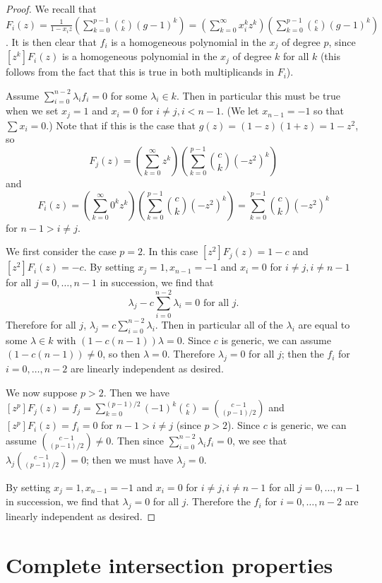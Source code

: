 \documentclass{amsart}
\numberwithin{equation}{section}
\theoremstyle{definition}
\begin{document}
\begin{proof} 
We recall that $F_i(z)=\frac{1}{1-x_iz}\left(\sum_{k=0}^{p-1} \binom{c}{k} (g-1)^k\right)=\left(\sum_{k=0}^\infty x_i^kz^k\right)\left(\sum_{k=0}^{p-1} \binom{c}{k} (g-1)^k\right)$. It is then clear that $f_i$ is a homogeneous polynomial in the $x_j$ of degree $p$, since $[z^k]F_i(z)$ is a homogeneous polynomial in the $x_j$ of degree $k$ for all $k$ (this follows from the fact that this is true in both multiplicands in $F_i$). 

Assume $\sum_{i=0}^{n-2} \lambda_if_i=0$ for some $\lambda_i \in k$. Then in particular this must be true when we set $x_j=1$ and $x_i=0$ for $i \ne j,i < n-1$. (We let $x_{n-1}=-1$ so that $\sum x_i=0$.) Note that if this is the case that $g(z)=(1-z)(1+z)=1-z^2$, so 
\[
F_j(z)=\left(\sum_{k=0}^\infty z^k\right)\left(\sum_{k=0}^{p-1} \binom{c}{k} (-z^2)^k\right)
\]
and 
\[
F_i(z)=\left(\sum_{k=0}^\infty 0^kz^k\right)\left(\sum_{k=0}^{p-1} \binom{c}{k} (-z^2)^k\right)=\sum_{k=0}^{p-1} \binom{c}{k} (-z^2)^k
\]
for $n-1>i \ne j$.

We first consider the case $p=2$. In this case $[z^2]F_j(z)=1-c$ and $[z^2]F_i(z)=-c$. By setting $x_j=1,x_{n-1}=-1$ and $x_i=0$ for $i \ne j, i \ne n-1$ for all $j=0,\dots,n-1$ in succession, we find that 
\[
\lambda_j-c\sum_{i=0}^{n-2} \lambda_i = 0 \text{ for all }j.
\]
Therefore for all $j$, $\lambda_j=c\sum_{i=0}^{n-2} \lambda_i$. Then in particular all of the $\lambda_i$ are equal to some $\lambda \in k$ with $(1-c(n-1))\lambda = 0$. Since $c$ is generic, we can assume $(1-c(n-1)) \ne 0$, so then $\lambda=0$. Therefore $\lambda_j=0$ for all $j$; then the $f_i$ for $i=0,\dots,n-2$ are linearly independent as desired.


We now suppose $p>2$. Then we have $[z^p]F_j(z)=f_j=\sum_{k=0}^{(p-1)/2} (-1)^k\binom{c}{k}=\binom{c-1}{(p-1)/2}$ and $[z^p]F_i(z)=f_i=0$ for $n-1>i \ne j$ (since $p > 2$). Since $c$ is generic, we can assume $\binom{c-1}{(p-1)/2} \ne 0$. Then since $\sum_{i=0}^{n-2} \lambda_if_i=0$, we see that $\lambda_j\binom{c-1}{(p-1)/2}=0$; then we must have $\lambda_j=0$.

By setting $x_j=1,x_{n-1}=-1$ and $x_i=0$ for $i \ne j, i \ne n-1$ for all $j=0,\dots,n-1$ in succession, we find that $\lambda_j=0$ for all $j$. Therefore the $f_i$ for $i=0,\dots,n-2$ are linearly independent as desired.
\end{proof}

\section{Complete intersection properties}
\end{document}
